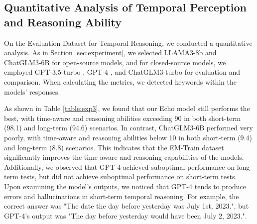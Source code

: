 \vspace{-3mm}




\subsection{Quantitative Analysis of Temporal Perception and Reasoning Ability}

On the Evaluation Dataset for Temporal Reasoning, we conducted a quantitative analysis. As in Section \ref{sec:experiment}, we selected LLAMA3-8b \cite{dubey2024llama} and ChatGLM3-6B \cite{glm2024chatglm} for open-source models, and for closed-source models, we employed GPT-3.5-turbo \cite{openai2023gpt4}, GPT-4 \cite{openai2023gpt4}, and ChatGLM3-turbo \cite{glm2024chatglm} for evaluation and comparison. When calculating the metrics, we detected keywords within the models' responses.

As shown in Table \ref{table:exp3}, we found that our Echo model still performs the best, with time-aware and reasoning abilities exceeding 90 in both short-term (98.1) and long-term (94.6) scenarios. In contrast, ChatGLM3-6B performed very poorly, with time-aware and reasoning abilities below 10 in both short-term (9.4) and long-term (8.8) scenarios. This indicates that the EM-Train dataset significantly improves the time-aware and reasoning capabilities of the models. Additionally, we observed that GPT-4 achieved suboptimal performance on long-term tests, but did not achieve suboptimal performance on short-term tests. Upon examining the model's outputs, we noticed that GPT-4 tends to produce errors and hallucinations in short-term temporal reasoning. For example, the correct answer was "The date the day before yesterday was July 1st, 2023.", but GPT-4's output was "The day before yesterday would have been July 2, 2023.".
 





